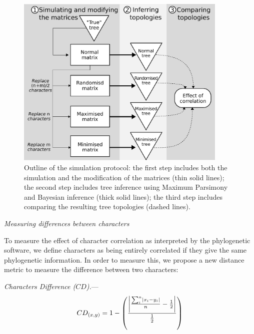 \documentclass[12pt,letterpaper]{article}
\DeclarePairedDelimiter\abs{\lvert}{\rvert}%
\renewcommand{\subsection}[1]{%
\bigskip
\begin{center}
\begin{large}
\normalfont\itshape #1
\end{large}
\end{center}}
\renewcommand{\subsubsection}[1]{%
\vspace{2ex}
\noindent
\textit{#1.}---}
\begin{document}
\begin{figure}[!htbp]
\centering
   \includegraphics[width=0.9\textwidth]{Figures/outline.pdf}
\caption{Outline of the simulation protocol: the first step includes both the simulation and the modification of the matrices (thin solid lines); the second step includes tree inference using Maximum Parsimony and Bayesian inference (thick solid lines); the third step includes comparing the resulting tree topologies (dashed lines).}
\label{Fig:outline}
\end{figure}

\subsection{Measuring differences between characters}
\label{CD_description}
To measure the effect of character correlation as interpreted by the phylogenetic software, we define characters as being entirely correlated if they give the same phylogenetic information.
In order to measure this, we propose a new distance metric to measure the difference between two characters:

\subsubsection{Characters Difference ($CD$)}
\begin{equation}
    CD_{(x,y)} = 1 - \left(\frac{\abs*{\frac{\sum_{i}^{n}\abs{x_{i} - y_{i}}}{n}-\frac{1}{2}}}{\frac{1}{2}}\right)
\end{equation}
\end{document}
